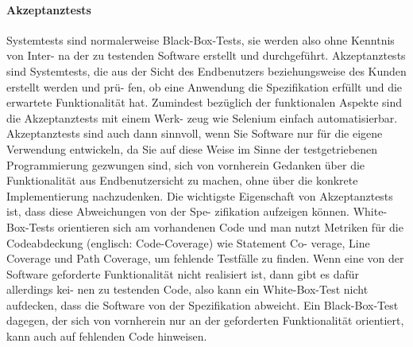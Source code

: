 \paragraph{Akzeptanztests}
Systemtests sind normalerweise Black-Box-Tests, sie werden also ohne Kenntnis von Inter-
na der zu testenden Software erstellt und durchgeführt. Akzeptanztests sind Systemtests,
die aus der Sicht des Endbenutzers beziehungsweise des Kunden erstellt werden und prü-
fen, ob eine Anwendung die Spezifikation erfüllt und die erwartete Funktionalität hat.
Zumindest bezüglich der funktionalen Aspekte sind die Akzeptanztests mit einem Werk-
zeug wie Selenium einfach automatisierbar. Akzeptanztests sind auch dann sinnvoll, wenn
Sie Software nur für die eigene Verwendung entwickeln, da Sie auf diese Weise im Sinne der
testgetriebenen Programmierung gezwungen sind, sich von vornherein Gedanken über die
Funktionalität aus Endbenutzersicht zu machen, ohne über die konkrete Implementierung
nachzudenken.
Die wichtigste Eigenschaft von Akzeptanztests ist, dass diese Abweichungen von der Spe-
zifikation aufzeigen können. White-Box-Tests orientieren sich am vorhandenen Code und
man nutzt Metriken für die Codeabdeckung (englisch: Code-Coverage) wie Statement Co-
verage, Line Coverage und Path Coverage, um fehlende Testfälle zu finden. Wenn eine von
der Software geforderte Funktionalität nicht realisiert ist, dann gibt es dafür allerdings kei-
nen zu testenden Code, also kann ein White-Box-Test nicht aufdecken, dass die Software
von der Spezifikation abweicht. Ein Black-Box-Test dagegen, der sich von vornherein nur
an der geforderten Funktionalität orientiert, kann auch auf fehlenden Code hinweisen.


